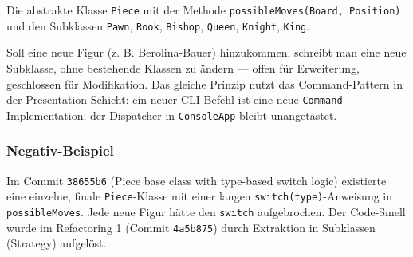 \documentclass[a4paper,12pt]{article}
\begin{document}
Die abstrakte Klasse \texttt{Piece} mit der Methode \texttt{possibleMoves(Board, Position)} und den
Subklassen \texttt{Pawn}, \texttt{Rook}, \texttt{Bishop}, \texttt{Queen}, \texttt{Knight},
\texttt{King}.


Soll eine neue Figur (z. B. \glqq{}Berolina-Bauer\grqq{}) hinzukommen, schreibt man eine neue
Subklasse, ohne bestehende Klassen zu ändern --- offen für Erweiterung, geschlossen für Modifikation.
Das gleiche Prinzip nutzt das Command-Pattern in der Presentation-Schicht: ein neuer CLI-Befehl
ist eine neue \texttt{Command}-Implementation; der Dispatcher in \texttt{ConsoleApp} bleibt
unangetastet.

\subsubsection*{Negativ-Beispiel}

Im Commit \texttt{38655b6} (\glqq{}Piece base class with type-based switch logic\grqq{})
existierte eine einzelne, finale \texttt{Piece}-Klasse mit einer langen
\texttt{switch(type)}-Anweisung in \texttt{possibleMoves}. Jede neue Figur hätte den
\texttt{switch} aufgebrochen. Der Code-Smell wurde im Refactoring 1 (Commit \texttt{4a5b875})
durch Extraktion in Subklassen (Strategy) aufgelöst.
\end{document}
